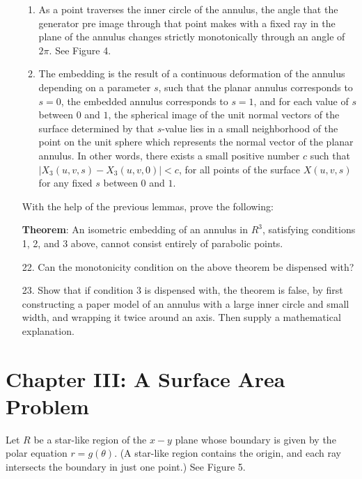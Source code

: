 \documentclass{book}
\begin{document}
\begin{enumerate}
\begin{enumerate}[\hspace{1cm}1)]
    \item As a point traverses the inner circle of the annulus, the angle that the generator pre image through that point makes with a fixed ray in the plane of the annulus changes strictly monotonically through an angle of $2 \pi$. See Figure 4.
    \item The embedding is the result of a continuous deformation of the annulus depending on a parameter $s$, such that the planar annulus corresponds to $s = 0$, the embedded annulus corresponds to $s = 1$, and for each value of $s$ between $0$ and $1$, the spherical image of the unit normal vectors of the surface determined by that $s$-value lies in a small neighborhood of the point on the unit sphere which represents the normal vector of the planar annulus. In other words, there exists a small positive number $c$ such that $\vert X_{3}(u,v,s) - X_{3}(u,v,0) \vert  < c$, for all points of the surface $X(u,v,s)$ for any fixed $s$ between $0$ and $1$.
  \end{enumerate}
  With the help of the previous lemmas, prove the following:

     \textbf{Theorem}: An isometric embedding of an annulus in $R^{3}$, satisfying conditions 1, 2, and 3 above, cannot consist entirely of parabolic points.
  \item[22.] Can the monotonicity condition on the above theorem be dispensed with?
  \item[23.] Show that if condition 3 is dispensed with, the theorem is false, by first constructing a paper model of an annulus with a large inner circle and small width, and wrapping it twice around an axis. Then supply a mathematical explanation.
\end{enumerate}



\chapter*{Chapter III: A Surface Area Problem}

\setcounter{equation}{0}

Let $R$ be a star-like region of the $x-y$ plane whose boundary is given by the polar equation $r = g(\theta)$. (A star-like region contains the origin, and each ray intersects the boundary in just one point.) See Figure 5. 
\end{document}
